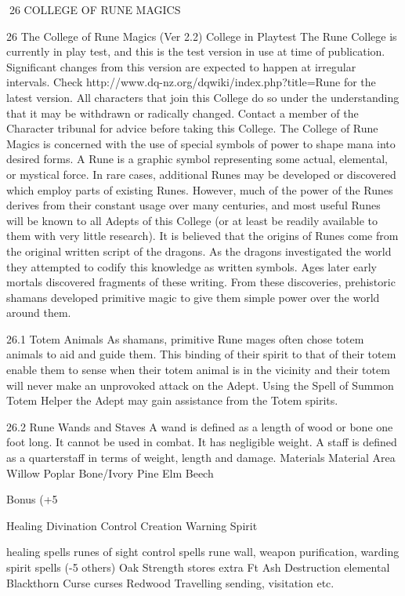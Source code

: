 \documentclass[a4paper]{article}
\begin{document}
\begin{multicols}{3}
26 COLLEGE OF RUNE MAGICS

26 The College of Rune Magics (Ver 2.2)
College in Playtest
The Rune College is currently in play test, and
this is the test version in use at time of publication. Significant changes from this version are
expected to happen at irregular intervals. Check
http://www.dq-nz.org/dqwiki/index.php?title=Rune
for the latest version.
All characters that join this College do so under
the understanding that it may be withdrawn or
radically changed. Contact a member of the
Character tribunal for advice before taking this
College.
The College of Rune Magics is concerned with the
use of special symbols of power to shape mana into
desired forms. A Rune is a graphic symbol representing some actual, elemental, or mystical force.
In rare cases, additional Runes may be developed
or discovered which employ parts of existing
Runes. However, much of the power of the Runes
derives from their constant usage over many centuries, and most useful Runes will be known to all
Adepts of this College (or at least be readily available to them with very little research). It is believed
that the origins of Runes come from the original
written script of the dragons. As the dragons investigated the world they attempted to codify this
knowledge as written symbols. Ages later early
mortals discovered fragments of these writing.
From these discoveries, prehistoric shamans developed primitive magic to give them simple power
over the world around them.

26.1 Totem Animals
As shamans, primitive Rune mages often chose
totem animals to aid and guide them. This binding
of their spirit to that of their totem enable them to
sense when their totem animal is in the vicinity and
their totem will never make an unprovoked attack
on the Adept. Using the Spell of Summon Totem
Helper the Adept may gain assistance from the
Totem spirits.

26.2 Rune Wands and Staves
A wand is defined as a length of wood or bone one
foot long. It cannot be used in combat. It has negligible weight. A staff is defined as a quarterstaff in
terms of weight, length and damage.
Materials
Material Area
Willow
Poplar
Bone/Ivory
Pine
Elm
Beech

Bonus (+5%

Healing
Divination
Control
Creation
Warning
Spirit

healing spells
runes of sight
control spells
rune wall, weapon
purification, warding
spirit spells (-5%
others)
Oak
Strength
stores extra Ft
Ash
Destruction elemental
Blackthorn Curse
curses
Redwood Travelling sending, visitation etc.


\end{multicols}
\end{document}
